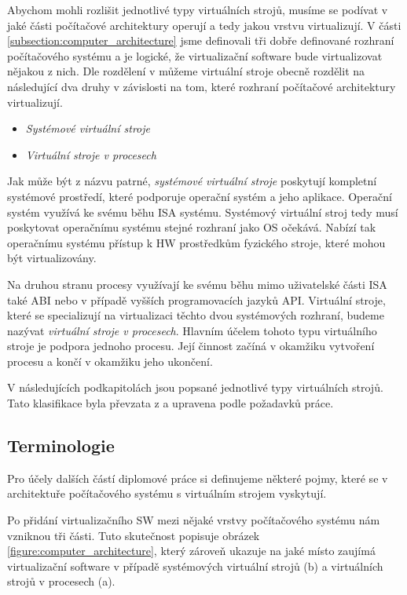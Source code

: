 Abychom mohli rozlišit jednotlivé typy virtuálních strojů, musíme se podívat v jaké části počítačové architektury operují a tedy jakou vrstvu virtualizují. V části \ref{subsection:computer_architecture} jsme definovali
tři dobře definované rozhraní počítačového systému a je logické, že virtualizační software bude virtualizovat nějakou z nich. Dle rozdělení v \cite{book:iee:vm_architecture} můžeme virtuální stroje obecně rozdělit na
následující dva druhy v závislosti na tom, které rozhraní počítačové architektury virtualizují.

\begin{itemize}
  \item \textit{Systémové virtuální stroje}
  \item \textit{Virtuální stroje v procesech}
\end{itemize}

Jak může být z názvu patrné, \textit{systémové virtuální stroje} poskytují kompletní systémové prostředí, které podporuje operační systém a jeho aplikace. Operační systém využívá ke svému běhu ISA systému. Systémový virtuální
stroj tedy musí poskytovat operačnímu systému stejné rozhraní jako OS očekává. Nabízí tak operačnímu systému přístup k HW prostředkům fyzického stroje, které mohou být virtualizovány. 

Na druhou stranu procesy využívají ke svému běhu mimo uživatelské části ISA také ABI nebo v případě vyšších programovacích jazyků API. Virtuální stroje, které se specializují na virtualizaci těchto dvou systémových 
rozhraní, budeme nazývat \textit{virtuální stroje v procesech}. Hlavním účelem tohoto typu virtuálního stroje je podpora jednoho procesu. Její činnost začíná v okamžiku vytvoření procesu a končí v okamžiku jeho ukončení.

V následujících podkapitolách jsou popsané jednotlivé typy virtuálních strojů. Tato klasifikace byla převzata z \cite{book:iee:vm_architecture} a upravena podle požadavků práce.

  \subsection*{Terminologie}
  
  Pro účely dalších částí diplomové práce si definujeme některé pojmy, které se v architektuře počítačového systému s virtuálním strojem vyskytují. 
  
  Po přidání virtualizačního SW mezi nějaké vrstvy počítačového systému nám vzniknou tři části. Tuto skutečnost popisuje obrázek \ref{figure:computer_architecture}, který zároveň ukazuje na jaké místo zaujímá virtualizační
  software v případě systémových virtuální strojů (b) a virtuálních strojů v procesech (a).
  
